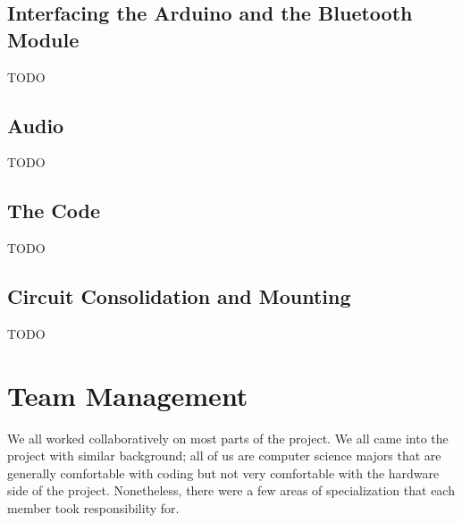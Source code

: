 \documentclass{es50report}
\begin{document}
    \subsection{Interfacing the Arduino and the Bluetooth Module}
    TODO

    \subsection{Audio}
    TODO

    \subsection{The Code}
    TODO

    \subsection{Circuit Consolidation and Mounting}
    TODO

    \section{Team Management}
        We all worked collaboratively on most parts of the project. We all came into the project with similar background; all of us are computer science majors that are generally comfortable with coding but not very comfortable with the hardware side of the project. Nonetheless, there were a few areas of specialization that each member took responsibility for.
\end{document}
